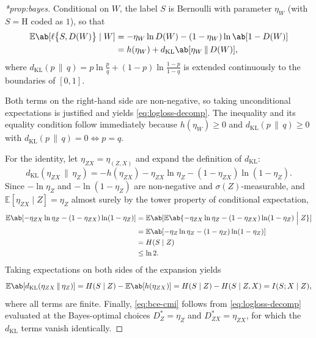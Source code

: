 \documentclass[12pt]{article}
\newcommand{\Herwig}{\mathrm{H}}
\newcommand{\E}{\mathbb{E}}
\newcommand{\kl}{d_{\mathrm{KL}}}
\newcommand{\1}{\mathbbm{1}}
\renewcommand{\[}{\begin{equation}}
\renewcommand{\]}{\end{equation}}
\begin{document}
\begin{proof}[*prop:bayes]
        Conditional on \(W\), the label \(S\) is Bernoulli with parameter \(\eta_W\) (with \(S=\Herwig\) coded as \(1\)), so that
        \[
            \begin{split}
                \E\ab[\ell\big\{S,D(W)\big\} \mid W] &= -\eta_W\ln D(W) - (1-\eta_W) \ln\ab[1-D(W)] \\
                &= h(\eta_W) + \kl\ab[\eta_W\,\|\,D(W)],
            \end{split}
        \]
        where \(\kl(p\,\|\,q) = p\ln\frac pq + (1-p)\ln\frac{1-p}{1-q}\) is extended continuously to the boundaries of \([0,1]\).
        
        Both terms on the right-hand side are non-negative, so taking unconditional expectations is justified and yields \cref{eq:logloss-decomp}.
        The inequality and its equality condition follow immediately because \(h(\eta_W) \ge 0\) and \(\kl(p\,\|\,q) \ge 0\) with \(\kl(p\,\|\,q)=0 \iff p=q\).

        For the identity, let \(\eta_{ZX} = \eta_{(Z,X)}\) and expand the definition of \(\kl\):
        \[
            \kl(\eta_{ZX}\,\|\,\eta_Z)= -h(\eta_{ZX}) -\eta_{ZX} \ln\eta_Z - (1-\eta_{ZX}) \ln(1-\eta_Z).
        \]
        Since \(-\ln\eta_Z\) and \(-\ln(1-\eta_Z)\) are non-negative and \(\sigma(Z)\)-measurable, and \(\E[\eta_{ZX}\mid Z]=\eta_Z\) almost surely by the tower property of conditional expectation,
        \[
            \begin{split}
                \E\ab[-\eta_{ZX}\ln\eta_Z-(1-\eta_{ZX})\ln(1-\eta_Z)] &= \E\ab[ \E\ab\{ -\eta_{ZX} \ln\eta_Z - (1-\eta_{ZX}) \ln(1-\eta_Z) \;\Big|\; Z\} ] \\
                &= \E\ab[-\eta_Z\ln\eta_Z-(1-\eta_Z)\ln(1-\eta_Z)] \\
                &= H(S\mid Z) \\
                &\le \ln 2.
            \end{split}
        \]
        Taking expectations on both sides of the expansion yields
        \[
            \E\ab[\kl(\eta_{ZX}\,\|\,\eta_Z)] = H(S\mid Z) - \E\ab[h(\eta_{ZX})] = H(S\mid Z) - H(S\mid Z,X) = I(S;X\mid Z),
        \]
        where all terms are finite.
        Finally, \cref{eq:bce-cmi} follows from \cref{eq:logloss-decomp} evaluated at the Bayes-optimal choices \(D_Z^*=\eta_Z\) and \(D_{ZX}^*=\eta_{ZX}\), for which the \(\kl\) terms vanish identically.
    \end{proof}
\end{document}
